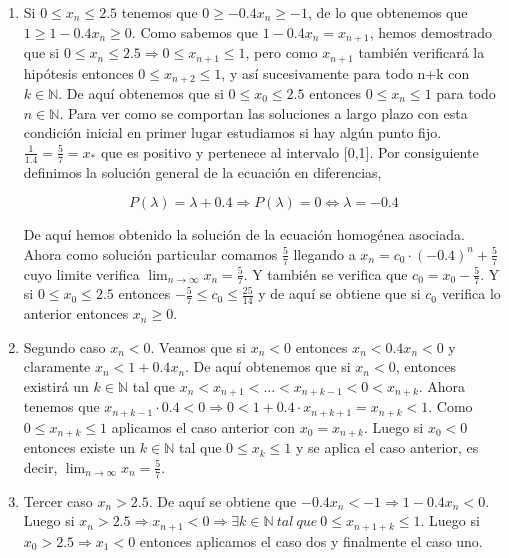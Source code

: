 \documentclass{article}
\begin{document}
\begin{enumerate}
\item Si $0\leq x_n \leq 2.5$ tenemos que $0 \geq -0.4 x_n \geq -1$, de lo que obtenemos que $1 \geq 1-0.4 x_n \geq 0$. Como sabemos que $1-0.4x_n = x_{n+1}$, hemos demostrado que si $0 \leq x_n \leq 2.5 \Rightarrow 0 \leq x_{n+1} \leq 1$, pero como $x_{n+1}$ también verificará la hipótesis entonces $0 \leq x_{n+2} \leq 1$, y así sucesivamente para todo n+k con $k \in \mathbb{N}$. De aquí obtenemos que si $0 \leq x_0 \leq 2.5$ entonces $0 \leq x_n \leq 1$ para todo $n\in \mathbb{N}$. Para ver como se comportan las soluciones a largo plazo con esta condición inicial en primer lugar estudiamos si hay algún punto fijo. $\frac{1}{1.4}=\frac{5}{7} =x_*$ que es positivo y pertenece al intervalo [0,1]. Por consiguiente definimos la solución general de la ecuación en diferencias,

\begin{equation*}
P(\lambda) = \lambda+0.4 \Rightarrow P(\lambda) = 0 \Leftrightarrow \lambda = -0.4
\end{equation*}

De aquí hemos obtenido la solución de la ecuación homogénea asociada. Ahora como solución particular comamos $\frac{5}{7}$ llegando a $x_n = c_0\cdot(-0.4)^n + \frac{5}{7}$ cuyo limite verifica $\lim_{n \to \infty} x_n = \frac{5}{7}$. Y también se verifica que $c_0 = x_0 - \frac{5}{7}$. Y si $0 \leq x_0 \leq 2.5$ entonces $-\frac{5}{7} \leq c_0 \leq \frac{25}{14}$ y de aquí se obtiene que si $c_0$ verifica lo anterior entonces $x_n \geq 0$.

\item Segundo caso $x_n < 0$. Veamos que si $x_n < 0$ entonces $x_n < 0.4x_n < 0$ y claramente $x_n < 1+0.4x_n$. De aquí obtenemos que si $x_n < 0$, entonces existirá un $k \in \mathbb{N}$ tal que $x_n < x_{n+1} < ... < x_{n+k-1} < 0 < x_{n+k}$. Ahora tenemos que 
$x_{n+k-1}\cdot0.4 < 0 \Rightarrow 0 <1 + 0.4\cdot x_{n+k+1}=x_{n+k} < 1$. Como $0\leq x_{n+k} \leq 1$ aplicamos el caso anterior con $x_0 = x_{n+k}$. Luego si $x_0 < 0$ entonces existe un $k \in \mathbb{N}$ tal que $0 \leq x_k \leq 1$ y se aplica el caso anterior, es decir, $\lim_{n \to \infty} x_n = \frac{5}{7}$.

\item Tercer caso $x_n > 2.5$. De aquí se obtiene que $-0.4x_n < -1 \Rightarrow 1 -0.4x_n < 0$. Luego si $x_n > 2.5 \Rightarrow x_{n+1} < 0 \Rightarrow \exists k \in \mathbb{N} \> tal \> que \> 0\leq x_{n+1+k} \leq 1$. Luego si $x_0 > 2.5 \Rightarrow x_1 < 0$ entonces aplicamos el caso dos y finalmente el caso uno.
\end{enumerate}
\end{document}
